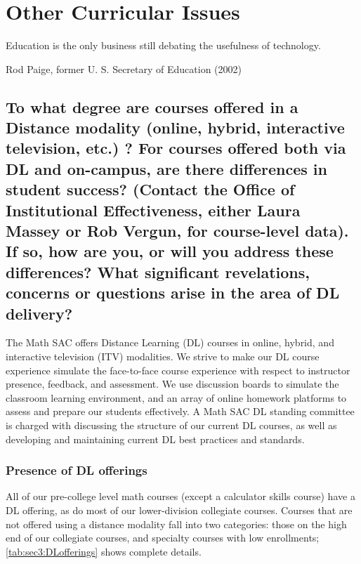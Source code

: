 \chapter{Other  Curricular Issues}\label{chap:otherissues}
\epigraph{Education is the only business still debating the usefulness of
	technology.}{Rod Paige, former U.
	S.
	Secretary of Education (2002)} \section[Distance education]{To what degree are courses offered in a Distance modality (online, hybrid, interactive television, etc.)
  ?
  For courses offered both via DL and on-campus, are there differences in student success?
  (Contact the Office of Institutional Effectiveness, either Laura Massey or Rob Vergun, for course-level data).
  If so, how are you, or will you address these differences?
  What significant revelations, concerns or questions arise in the area of DL delivery?
 }\label{other:sec:distancelearning}

The Math SAC offers Distance Learning (DL) courses in online, hybrid, and interactive television (ITV) modalities.
We strive to make our DL course experience simulate the face-to-face course experience with respect to instructor presence, feedback, and assessment.
We use discussion boards to simulate the classroom learning environment, and an array of online homework platforms to assess and prepare our students effectively.
A Math SAC DL standing committee is charged with discussing the structure of our current DL courses, as well as developing and maintaining current DL best practices and standards.

\subsection{Presence of DL offerings}
All of our pre-college level math courses (except a calculator skills course) have a DL offering, as do most of our lower-division collegiate courses.
Courses that are not offered using a distance modality fall into two categories: those on the high end of our collegiate courses, and specialty courses with low enrollments; \cref{tab:sec3:DLofferings} shows complete details.

